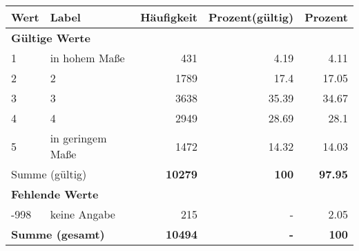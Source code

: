     \begin{longtable}{lXrrr}
     \toprule
     \textbf{Wert} & \textbf{Label} & \textbf{Häufigkeit} & \textbf{Prozent(gültig)} & \textbf{Prozent} \\
     \endhead
     \midrule
     \multicolumn{5}{l}{\textbf{Gültige Werte}}\\

     1 &
     \multicolumn{1}{X}{ in hohem Maße   } &


       \num{431} &
       \num[round-mode=places,round-precision=2]{4,19} &
         \num[round-mode=places,round-precision=2]{4,11} \\

     2 &
     \multicolumn{1}{X}{ 2   } &


       \num{1789} &
       \num[round-mode=places,round-precision=2]{17,4} &
         \num[round-mode=places,round-precision=2]{17,05} \\

     3 &
     \multicolumn{1}{X}{ 3   } &


       \num{3638} &
       \num[round-mode=places,round-precision=2]{35,39} &
         \num[round-mode=places,round-precision=2]{34,67} \\

     4 &
     \multicolumn{1}{X}{ 4   } &


       \num{2949} &
       \num[round-mode=places,round-precision=2]{28,69} &
         \num[round-mode=places,round-precision=2]{28,1} \\

     5 &
     \multicolumn{1}{X}{ in geringem Maße   } &


       \num{1472} &
       \num[round-mode=places,round-precision=2]{14,32} &
         \num[round-mode=places,round-precision=2]{14,03} \\
     \midrule
     \multicolumn{2}{l}{Summe (gültig)} &
       \textbf{\num{10279}} &
     \textbf{100} &
       \textbf{\num[round-mode=places,round-precision=2]{97,95}} \\
     \multicolumn{5}{l}{\textbf{Fehlende Werte}}\\
       -998 &
       keine Angabe &
         \num{215} &
        - &
         \num[round-mode=places,round-precision=2]{2,05} \\
     \midrule
     \multicolumn{2}{l}{\textbf{Summe (gesamt)}} &
          \textbf{\num{10494}} &
        \textbf{-} &
        \textbf{100} \\
     \bottomrule
     \end{longtable}
     
